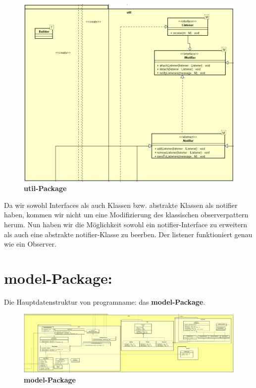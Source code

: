 \begin{figure}[H]
  \centering
  \includegraphics[width=\textwidth]{../diagramimages/util.png}
  \caption{\textbf{util-Package}}
\end{figure}

Da wir sowohl Interfaces als auch Klassen bzw. abstrakte Klassen als \gls{notifier} haben, kommen wir nicht um eine Modifizierung des klassischen \gls{observerpattern} herum. Nun haben wir die Möglichkeit sowohl ein \gls{notifier}-Interface zu erweitern als auch eine abstrakte \gls{notifier}-Klasse zu beerben. Der \gls{listener} funktioniert genau wie ein Observer.


\section{\textbf{model-Package:}}


Die Hauptdatenstruktur von \gls{programname}: das \textbf{model-Package}.

\begin{figure}[H]
  \centering
  \includegraphics[width=\textwidth]{../diagramimages/model.png}
  \caption{\textbf{model-Package}}
\end{figure}

